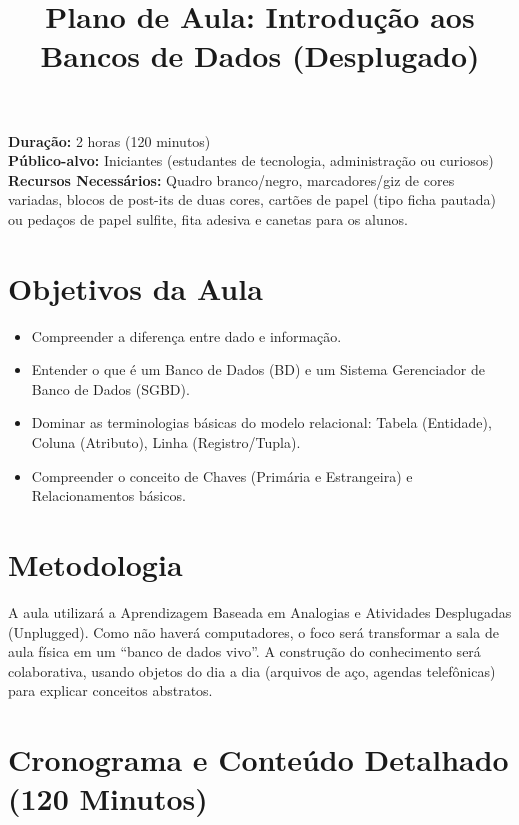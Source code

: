 \documentclass[12pt,a4paper]{article}
\title{Plano de Aula: Introdução aos Bancos de Dados (Desplugado)}
\date{}
\begin{document}
\maketitle

\noindent
\textbf{Duração:} 2 horas (120 minutos)\\
\textbf{Público-alvo:} Iniciantes (estudantes de tecnologia, administração ou curiosos)\\
\textbf{Recursos Necessários:} Quadro branco/negro, marcadores/giz de cores variadas, blocos de post-its de duas cores, cartões de papel (tipo ficha pautada) ou pedaços de papel sulfite, fita adesiva e canetas para os alunos.

\section{Objetivos da Aula}
\begin{itemize}[leftmargin=*,itemsep=0.25em]
  \item Compreender a diferença entre dado e informação.
  \item Entender o que é um Banco de Dados (BD) e um Sistema Gerenciador de Banco de Dados (SGBD).
  \item Dominar as terminologias básicas do modelo relacional: Tabela (Entidade), Coluna (Atributo), Linha (Registro/Tupla).
  \item Compreender o conceito de Chaves (Primária e Estrangeira) e Relacionamentos básicos.
\end{itemize}

\section{Metodologia}
A aula utilizará a Aprendizagem Baseada em Analogias e Atividades Desplugadas (Unplugged). Como não haverá computadores, o foco será transformar a sala de aula física em um ``banco de dados vivo''. A construção do conhecimento será colaborativa, usando objetos do dia a dia (arquivos de aço, agendas telefônicas) para explicar conceitos abstratos.

\section{Cronograma e Conteúdo Detalhado (120 Minutos)}
\end{document}
